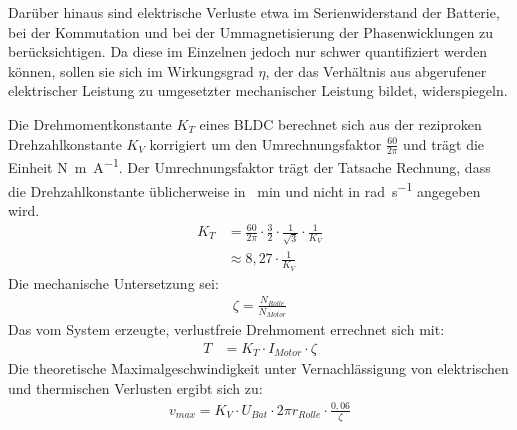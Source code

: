 	Darüber hinaus sind elektrische Verluste etwa im Serienwiderstand der Batterie, bei der Kommutation und bei der Ummagnetisierung der Phasenwicklungen zu berücksichtigen.
	Da diese im Einzelnen jedoch nur schwer quantifiziert werden können, sollen sie sich im Wirkungsgrad \(\eta\), der das Verhältnis aus abgerufener elektrischer Leistung zu umgesetzter mechanischer Leistung bildet, widerspiegeln.\par\medskip
	Die Drehmomentkonstante \(K_T\) eines BLDC berechnet sich aus der reziproken Drehzahlkonstante \(K_V\) korrigiert um den Umrechnungsfaktor \(\frac{60}{2\pi}\) und trägt die Einheit \unit{\newton\metre\per\ampere}.
	Der Umrechnungsfaktor trägt der Tatsache Rechnung, dass die Drehzahlkonstante üblicherweise in \unit{\per\minute} und nicht in \unit{\radian\per\second} angegeben wird\cite{DalY.Ohm.2000}.
	\begin{align}
		K_T	&= \frac{60}{2\pi} \cdot \frac{3}{2} \cdot \frac{1}{\sqrt{3}} \cdot \frac{1}{K_V} \nonumber \\
			&\approx 8,27 \cdot \frac{1}{K_V}
		\label{eq:kv to kt}
	\end{align}
	Die mechanische Untersetzung sei:
	\begin{align}
		\zeta = \frac{N_{Rolle}}{N_{Motor}}
		\label{eq:reduction}
	\end{align}
	Das vom System erzeugte, verlustfreie Drehmoment errechnet sich mit:
	\begin{align}
		T	&= K_T \cdot I_{Motor} \cdot \zeta
		\label{eq:frictionless torque}
	\end{align}
	Die theoretische Maximalgeschwindigkeit unter Vernachlässigung von elektrischen und thermischen Verlusten ergibt sich zu:
	\begin{align}
		v_{max} = K_V \cdot U_{Bat} \cdot 2\pi r_{Rolle} \cdot \frac{0,06}{\zeta}
		\label{eq:max speed km h}
	\end{align}
	\nocite{Meschede.2015}\nocite{Demtroder.2018}